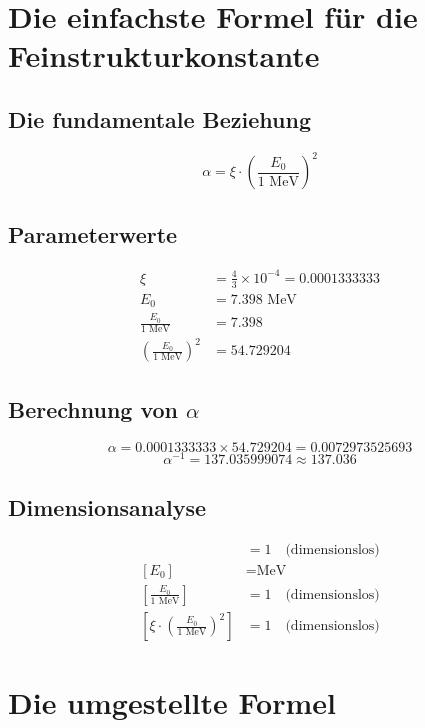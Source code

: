 	\section*{Die einfachste Formel für die Feinstrukturkonstante}
	
	\subsection*{Die fundamentale Beziehung}
	
	\[
	\boxed{\alpha = \xi \cdot \left(\frac{E_0}{1 \text{ MeV}}\right)^2}
	\]
	
	\subsection*{Parameterwerte}
	
	\begin{align*}
		\xi &= \frac{4}{3} \times 10^{-4} = 0.0001333333 \\
		E_0 &= 7.398 \text{ MeV} \\
		\frac{E_0}{1 \text{ MeV}} &= 7.398 \\
		\left(\frac{E_0}{1 \text{ MeV}}\right)^2 &= 54.729204
	\end{align*}
	
	\subsection*{Berechnung von $\alpha$}
	
	\[
	\alpha = 0.0001333333 \times 54.729204 = 0.0072973525693
	\]
	\[
	\alpha^{-1} = 137.035999074 \approx 137.036
	\]
	
	\subsection*{Dimensionsanalyse}
	
	\begin{align*}
		[\xi] &= 1 \quad \text{(dimensionslos)} \\
		[E_0] &= \text{MeV} \\
		\left[\frac{E_0}{1 \text{ MeV}}\right] &= 1 \quad \text{(dimensionslos)} \\
		\left[\xi \cdot \left(\frac{E_0}{1 \text{ MeV}}\right)^2\right] &= 1 \quad \text{(dimensionslos)}
	\end{align*}
	
	\section*{Die umgestellte Formel}
	
